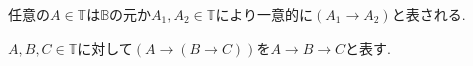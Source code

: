 \begin{proposition}
任意の$A \in \mathbb{T}$は$\mathbb{B}$の元か$A_1, A_2 \in \mathbb{T}$により一意的に$(A_1 \to A_2)$と表される.
\end{proposition}

\begin{remark}
$A,B,C \in \mathbb{T}$に対して$(A \to (B \to C))$を$A \to B \to C$と表す.
\end{remark}